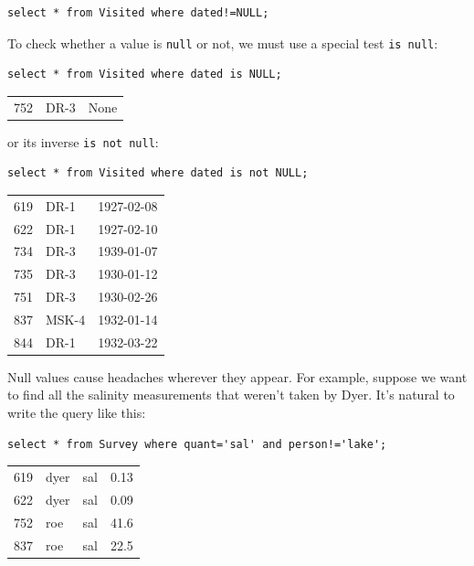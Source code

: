 \documentclass{book}
\begin{document}

\begin{verbatim}
select * from Visited where dated!=NULL;
\end{verbatim}


To check whether a value is \texttt{null} or not, we must use a special
test \texttt{is null}:

\begin{verbatim}
select * from Visited where dated is NULL;
\end{verbatim}

\begin{tabular}{lll}
752 & DR-3 & None \\
\end{tabular}

or its inverse \texttt{is not null}:

\begin{verbatim}
select * from Visited where dated is not NULL;
\end{verbatim}

\begin{tabular}{lll}
619 & DR-1 & 1927-02-08 \\
622 & DR-1 & 1927-02-10 \\
734 & DR-3 & 1939-01-07 \\
735 & DR-3 & 1930-01-12 \\
751 & DR-3 & 1930-02-26 \\
837 & MSK-4 & 1932-01-14 \\
844 & DR-1 & 1932-03-22 \\
\end{tabular}

Null values cause headaches wherever they appear. For example, suppose
we want to find all the salinity measurements that weren't taken by
Dyer. It's natural to write the query like this:

\begin{verbatim}
select * from Survey where quant='sal' and person!='lake';
\end{verbatim}

\begin{tabular}{llll}
619 & dyer & sal & 0.13 \\
622 & dyer & sal & 0.09 \\
752 & roe & sal & 41.6 \\
837 & roe & sal & 22.5 \\
\end{tabular}
\end{document}
